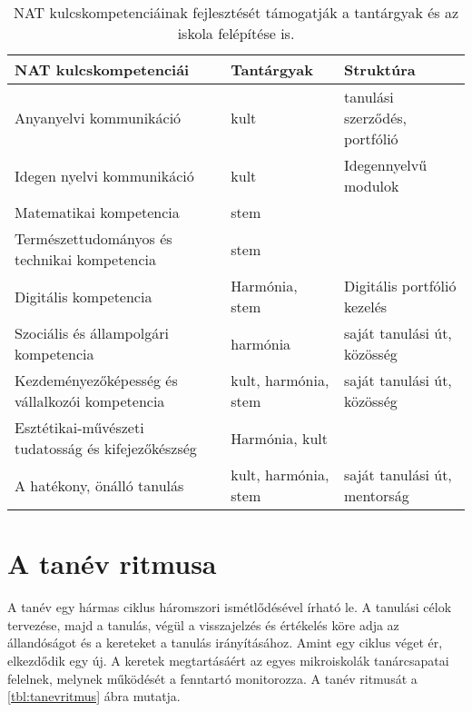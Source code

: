 \begin{table}
  \centering
      \begin{tabular}{p{5cm}|>{\raggedright}p{3cm}|p{3cm}}


        \textbf{NAT kulcskompetenciái} & \textbf{Tantárgyak} & \textbf{Struktúra}\\ \hline
Anyanyelvi kommunikáció & kult & tanulási szerződés, portfólió\\ \hline
Idegen nyelvi kommunikáció & kult & Idegennyelvű modulok\\ \hline
Matematikai kompetencia & stem & \\ \hline
Természettudományos és technikai kompetencia & stem & \\ \hline
Digitális kompetencia & Harmónia, stem & Digitális portfólió kezelés\\ \hline
Szociális és állampolgári kompetencia & harmónia & saját tanulási út, közösség\\ \hline
Kezdeményezőképesség és vállalkozói kompetencia & kult, harmónia, stem & saját tanulási út, közösség\\ \hline
Esztétikai-művészeti tudatosság és kifejezőkészség & Harmónia, kult & \\ \hline
A hatékony, önálló tanulás & kult, harmónia, stem & saját tanulási út, mentorság\\

      \end{tabular}
      \caption{NAT kulcskompetenciáinak fejlesztését támogatják a tantárgyak és az iskola felépítése is.}
      \label{tbl:nat_kulcs}
    \end{table}

\section{A tanév ritmusa}

A tanév egy hármas ciklus háromszori ismétlődésével írható le. A tanulási célok tervezése, majd a tanulás, végül a visszajelzés és értékelés köre adja az állandóságot és a kereteket a tanulás irányításához. Amint egy ciklus véget ér, elkezdődik egy új. A keretek megtartásáért az egyes mikroiskolák tanárcsapatai felelnek, melynek működését a fenntartó monitorozza. A tanév ritmusát a \ref{tbl:tanevritmus} ábra mutatja.



